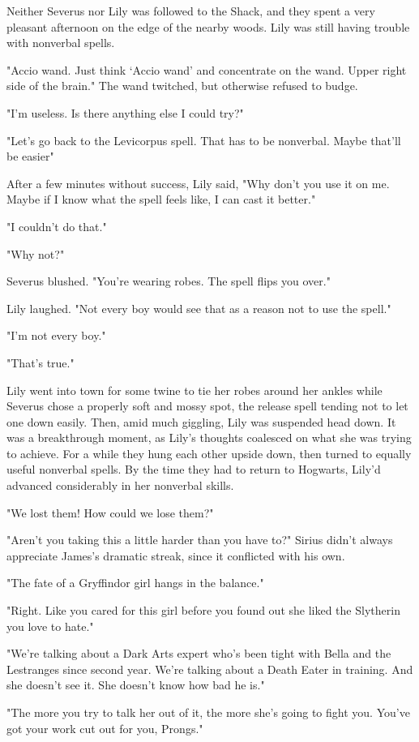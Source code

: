 Neither Severus nor Lily was followed to the Shack, and they spent a very pleasant afternoon on the edge of the nearby woods. Lily was still having trouble with nonverbal spells.

"Accio wand. Just think `Accio wand' and concentrate on the wand. Upper right side of the brain." The wand twitched, but otherwise refused to budge.

"I'm useless. Is there anything else I could try?"

"Let's go back to the Levicorpus spell. That has to be nonverbal. Maybe that'll be easier"

After a few minutes without success, Lily said, "Why don't you use it on me. Maybe if I know what the spell feels like, I can cast it better."

"I couldn't do that."

"Why not?"

Severus blushed. "You're wearing robes. The spell flips you over."

Lily laughed. "Not every boy would see that as a reason not to use the spell."

"I'm not every boy."

"That's true."

Lily went into town for some twine to tie her robes around her ankles while Severus chose a properly soft and mossy spot, the release spell tending not to let one down easily. Then, amid much giggling, Lily was suspended head down. It was a breakthrough moment, as Lily's thoughts coalesced on what she was trying to achieve. For a while they hung each other upside down, then turned to equally useful nonverbal spells. By the time they had to return to Hogwarts, Lily'd advanced considerably in her nonverbal skills.

"We lost them! How could we lose them?"

"Aren't you taking this a little harder than you have to?" Sirius didn't always appreciate James's dramatic streak, since it conflicted with his own.

"The fate of a Gryffindor girl hangs in the balance."

"Right. Like you cared for this girl before you found out she liked the Slytherin you love to hate."

"We're talking about a Dark Arts expert who's been tight with Bella and the Lestranges since second year. We're talking about a Death Eater in training. And she doesn't see it. She doesn't know how bad he is."

"The more you try to talk her out of it, the more she's going to fight you. You've got your work cut out for you, Prongs."

